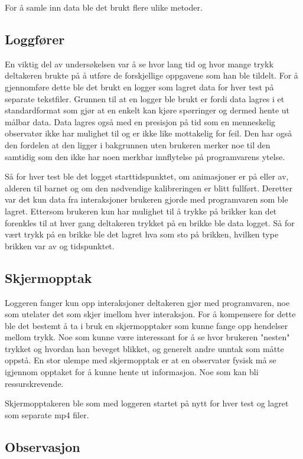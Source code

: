  
For å samle inn data ble det brukt flere ulike metoder.  
 
 
\subsection{Loggfører} 

En viktig del av undersøkelsen var å se hvor lang tid og hvor mange trykk deltakeren brukte på å utføre de forskjellige oppgavene som han ble tildelt. For å gjennomføre dette ble det brukt en logger som lagret data for hver test på separate tekstfiler. Grunnen til at en logger ble brukt er fordi data lagres i et standardformat som gjør at en enkelt kan kjøre spørringer og dermed hente ut målbar data. Data lagres også med en presisjon på tid som en menneskelig observatør ikke har mulighet til og er ikke like mottakelig for feil. Den har også den fordelen at den ligger i bakgrunnen uten brukeren merker noe til den samtidig som den ikke har noen merkbar innflytelse på programvarens ytelse. 
 
 
Så for hver test ble det logget starttidspunktet, om animasjoner er på eller av, alderen til barnet og om den nødvendige kalibreringen er blitt fullført. Deretter var det kun data fra interaksjoner brukeren gjorde med programvaren som ble lagret. Ettersom brukeren kun har mulighet til å trykke på brikker kan det forenkles til at hver gang deltakeren trykket på en brikke ble data logget. Så for vært trykk på en brikke ble det lagret hva som sto på brikken, hvilken type brikken var av og tidspunktet. 
 
 
\subsection{Skjermopptak} 
 
Loggeren fanger kun opp interaksjoner deltakeren gjør med programvaren, noe som utelater det som skjer imellom hver interaksjon. For å kompensere for dette ble det bestemt å ta i bruk en skjermopptaker som kunne fange opp hendelser mellom trykk. Noe som kunne være interessant for å se hvor brukeren "nesten" trykket og hvordan han beveget blikket, og generelt andre unntak som måtte oppstå. En stor ulempe med skjermopptak er at en observatør fysisk må se igjennom opptaket for å kunne hente ut informasjon. Noe som kan bli ressurskrevende.
 
Skjermopptakeren ble som med loggeren startet på nytt for hver test og lagret som separate mp4 filer.  
 
 
\subsection{Observasjon} 
 
